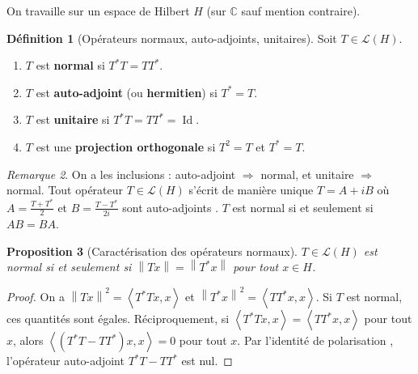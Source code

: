 \documentclass[a4paper,12pt]{book}
\DeclareMathOperator{\Id}{Id}
\newcommand{\C}{\mathbb{C}}
\newcommand{\norm}[1]{\left\| #1 \right\|}
\newcommand{\inner}[2]{\left\langle #1, #2 \right\rangle}
\theoremstyle{definition}
\newtheorem{definition}{Définition}[chapter]
\theoremstyle{plain}
\newtheorem{proposition}[definition]{Proposition}
\theoremstyle{remark}
\newtheorem{remarque}[definition]{Remarque}
\begin{document}

On travaille sur un espace de Hilbert $H$ (sur $\C$ sauf mention contraire).

\begin{definition}[Opérateurs normaux, auto-adjoints, unitaires]\label{def:normal-sa-unitaire}
Soit $T \in \mathcal{L}(H)$.
\begin{enumerate}[label=(\roman*)]
    \item $T$ est \textbf{normal} si $T^*T = TT^*$.
    \item $T$ est \textbf{auto-adjoint} (ou \textbf{hermitien})%
           si $T^* = T$.
    \item $T$ est \textbf{unitaire} si
          $T^*T = TT^* = \Id$.
    \item $T$ est une \textbf{projection orthogonale}
          si $T^2 = T$ et $T^* = T$.
\end{enumerate}
\end{definition}

\begin{remarque}\label{rem:inclusions-normaux}
On a les inclusions : auto-adjoint $\Rightarrow$ normal, et unitaire $\Rightarrow$ normal.
Tout opérateur $T \in \mathcal{L}(H)$ s'écrit de manière unique
$T = A + iB$ où $A = \frac{T+T^*}{2}$ et $B = \frac{T-T^*}{2i}$ sont auto-adjoints%
.
$T$ est normal si et seulement si $AB = BA$.
\end{remarque}

\begin{proposition}[Caractérisation des opérateurs normaux]\label{prop:caract-normal}
$T \in \mathcal{L}(H)$ est normal si et seulement si $\norm{Tx} = \norm{T^*x}$ pour
tout $x \in H$.
\end{proposition}

\begin{proof}
On a $\norm{Tx}^2 = \inner{T^*Tx}{x}$ et $\norm{T^*x}^2 = \inner{TT^*x}{x}$. Si
$T$ est normal, ces quantités sont égales. Réciproquement, si
$\inner{T^*Tx}{x} = \inner{TT^*x}{x}$ pour tout $x$, alors
$\inner{(T^*T - TT^*)x}{x} = 0$ pour tout $x$. Par l'identité de polarisation%
, l'opérateur auto-adjoint $T^*T - TT^*$
est nul.
\end{proof}
\end{document}

